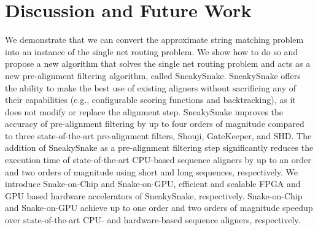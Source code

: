 \documentclass{bioinfo}
\begin{document}
\section{Discussion and Future Work} \label{sec:conclusion}
We {demonstrate {that} we can} convert {the} approximate string matching problem into an instance of the single net routing problem. 
We {show how to do so and} propose a new algorithm that solves the single net routing problem and acts as a new pre-alignment filtering algorithm, {called} SneakySnake. 
SneakySnake offers the ability to make the best use of existing aligners without sacrificing any of their capabilities (e.g., configurable scoring functions and backtracking), as it does not modify or replace the alignment step. %
SneakySnake improves the accuracy of pre-alignment filtering by up to four orders of magnitude compared to {three} state-of-the-art pre-alignment filters, Shouji, GateKeeper, and SHD. The addition of SneakySnake as a pre-alignment filtering step {significantly} reduces the execution time of state-of-the-art CPU-based sequence aligners by up to an order {and two orders of magnitude using short and long sequences, respectively}. 
{We introduce Snake-on-Chip and Snake-on-GPU, efficient and scalable FPGA and GPU based hardware accelerators of SneakySnake, respectively}. Snake-on-Chip and Snake-on-GPU achieve up to {one order and} two orders of magnitude speedup {over} state-of-the-art {CPU- and hardware-based sequence aligners, respectively}.
\end{document}
